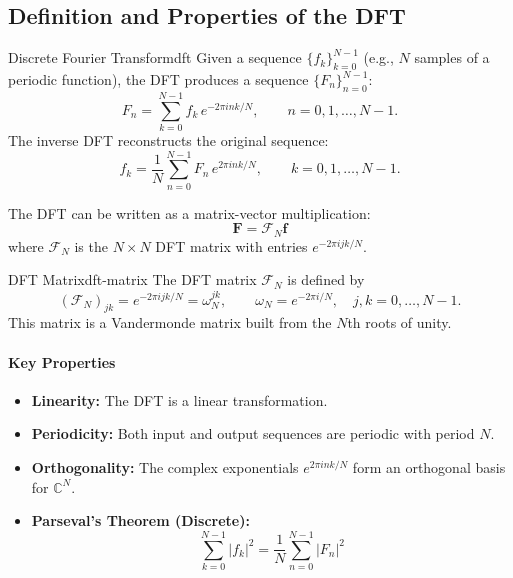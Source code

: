 \subsection{Definition and Properties of the DFT}
\begin{definition}{Discrete Fourier Transform}{dft}
    Given a sequence $\{f_k\}_{k=0}^{N-1}$ (e.g., $N$ samples of a periodic function), the DFT produces a sequence $\{F_n\}_{n=0}^{N-1}$:
    \begin{equation}
        F_n = \sum_{k=0}^{N-1} f_k \, e^{-2\pi i n k / N}, \qquad n = 0, 1, \ldots, N-1.
    \end{equation}
    The inverse DFT reconstructs the original sequence:
    \begin{equation}
        f_k = \frac{1}{N} \sum_{n=0}^{N-1} F_n \, e^{2\pi i n k / N}, \qquad k = 0, 1, \ldots, N-1.
    \end{equation}
\end{definition}

The DFT can be written as a matrix-vector multiplication:
\begin{equation}
    \mathbf{F} = \mathcal{F}_N \mathbf{f}
\end{equation}
where $\mathcal{F}_N$ is the $N \times N$ DFT matrix with entries $e^{-2\pi i jk / N}$.

\begin{definition}{DFT Matrix}{dft-matrix}
    The DFT matrix $\mathcal{F}_N$ is defined by
    \begin{equation}
        (\mathcal{F}_N)_{jk} = e^{-2\pi i jk / N} = \omega_N^{jk}, \qquad \omega_N = e^{-2\pi i / N}, \quad j, k = 0, \ldots, N-1.
    \end{equation}
    This matrix is a Vandermonde matrix built from the $N$th roots of unity.
\end{definition}

\paragraph{Key Properties}
\begin{itemize}
    \item \textbf{Linearity:} The DFT is a linear transformation.
    \item \textbf{Periodicity:} Both input and output sequences are periodic with period $N$.
    \item \textbf{Orthogonality:} The complex exponentials $e^{2\pi i n k / N}$ form an orthogonal basis for $\mathbb{C}^N$.
    \item \textbf{Parseval's Theorem (Discrete):}
          \[
              \sum_{k=0}^{N-1} |f_k|^2 = \frac{1}{N} \sum_{n=0}^{N-1} |F_n|^2
          \]
\end{itemize}

